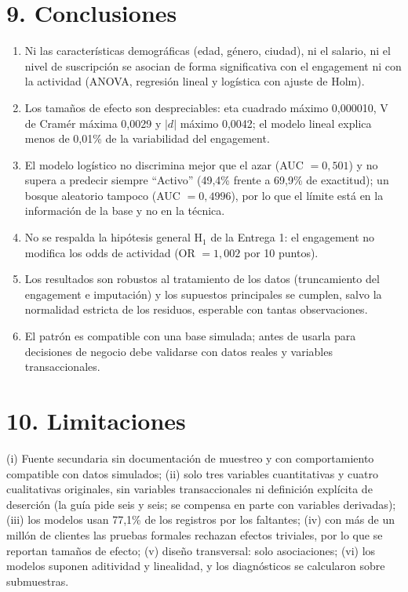 \documentclass[a4,11pt]{aleph-notas}
\begin{document}
\section*{9. Conclusiones}
\begin{enumerate}
    \item Ni las características demográficas (edad, género, ciudad), ni el salario, ni el nivel de suscripción se asocian de forma significativa con el engagement ni con la actividad (ANOVA, regresión lineal y logística con ajuste de Holm).
    \item Los tamaños de efecto son despreciables: eta cuadrado máximo 0,000010, V de Cramér máxima 0,0029 y $|d|$ máximo 0,0042; el modelo lineal explica menos de 0,01\% de la variabilidad del engagement.
    \item El modelo logístico no discrimina mejor que el azar (AUC $=0{,}501$) y no supera a predecir siempre ``Activo'' (49,4\% frente a 69,9\% de exactitud); un bosque aleatorio tampoco (AUC $=0{,}4996$), por lo que el límite está en la información de la base y no en la técnica.
    \item No se respalda la hipótesis general H$_1$ de la Entrega 1: el engagement no modifica los odds de actividad (OR $=1{,}002$ por 10 puntos).
    \item Los resultados son robustos al tratamiento de los datos (truncamiento del engagement e imputación) y los supuestos principales se cumplen, salvo la normalidad estricta de los residuos, esperable con tantas observaciones.
    \item El patrón es compatible con una base simulada; antes de usarla para decisiones de negocio debe validarse con datos reales y variables transaccionales.
\end{enumerate}

\section*{10. Limitaciones}
(i) Fuente secundaria sin documentación de muestreo y con comportamiento compatible con datos simulados; (ii) solo tres variables cuantitativas y cuatro cualitativas originales, sin variables transaccionales ni definición explícita de deserción (la guía pide seis y seis; se compensa en parte con variables derivadas); (iii) los modelos usan 77,1\% de los registros por los faltantes; (iv) con más de un millón de clientes las pruebas formales rechazan efectos triviales, por lo que se reportan tamaños de efecto; (v) diseño transversal: solo asociaciones; (vi) los modelos suponen aditividad y linealidad, y los diagnósticos se calcularon sobre submuestras.
\end{document}
